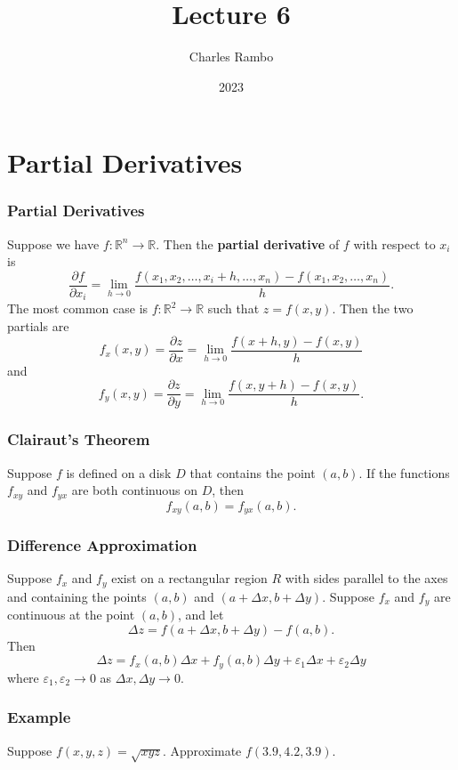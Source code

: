 \documentclass{beamer}
\title{Lecture 6}
\author{Charles Rambo}
\institute{UCLA Anderson School of Management}
\date{2023}
\begin{document}
\insertTitleSlide


\section{Partial Derivatives}

\begin{frame}
\frametitle{Partial Derivatives}
{\small 
\begin{Definition}
Suppose we have $f:\mathbb{R}^n \to \mathbb{R}$. Then the {\bf partial derivative} of $f$ with respect to $x_i$ is
$$
\frac{\partial f}{\partial x_i} = \lim_{h\to 0} \frac{f(x_1, x_2,\ldots, x_i + h,\ldots, x_n) - f(x_1, x_2,\ldots, x_n)}{h}.
$$
The most common case is $f:\mathbb{R}^2\to \mathbb{R}$ such that $z = f(x, y)$. Then the two partials are
$$
f_x(x, y) = \frac{\partial z}{\partial x} = \lim_{h\to 0 } \frac{f(x + h, y) - f(x, y)}{h}
$$
and
$$
f_y(x, y) = \frac{\partial z}{\partial y} = \lim_{h\to 0 } \frac{f(x, y + h) - f(x, y)}{h}.
$$
\end{Definition}
}
\end{frame}

\begin{frame}
\frametitle{Clairaut's Theorem}

\begin{Theorem}[Clairaut]
Suppose $f$ is defined on a disk $D$ that contains the point $(a, b)$. If the functions $f_{xy}$ and $f_{yx}$ are both continuous on $D$, then
$$
f_{xy}(a, b) = f_{yx}(a, b).
$$
\end{Theorem}

\end{frame}

\begin{frame}
\frametitle{Difference Approximation}

\begin{Theorem}
Suppose $f_x$ and $f_y$ exist on a rectangular region $R$ with sides parallel to the axes and containing the points $(a, b)$ and $(a + \Delta x, b + \Delta y)$. Suppose $f_x$ and $f_y$ are continuous at the point $(a, b)$, and let
$$
\Delta z = f(a + \Delta x, b + \Delta y) - f(a, b).
$$
Then
$$
\Delta z = f_x(a, b)\Delta x + f_y(a, b)\Delta y + \varepsilon_1\Delta x + \varepsilon_2\Delta y
$$
where $\varepsilon_1,\varepsilon_2\to 0$ as $\Delta x,\Delta y\to 0$.

\end{Theorem}

\end{frame}

\begin{frame}[t]
\frametitle{Example}
\begin{Example}
Suppose $f(x, y, z) = \sqrt{xyz}$. Approximate $f(3.9, 4.2, 3.9)$.
\end{Example}

\end{frame}
\end{document}
